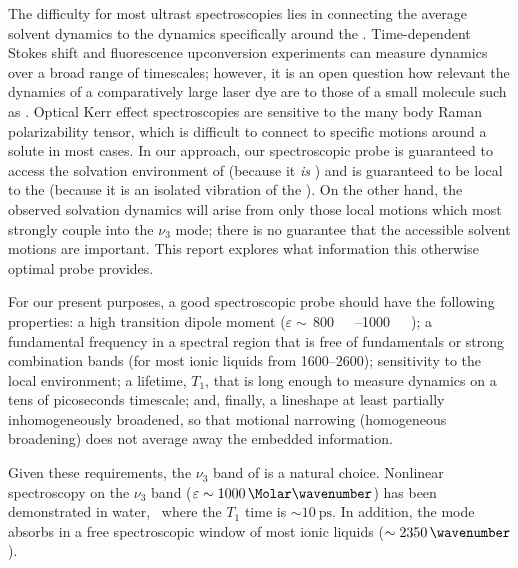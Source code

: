 The difficulty for most ultrast spectroscopies lies in connecting the average solvent dynamics to the dynamics specifically around the . Time-dependent Stokes shift and fluorescence upconversion experiments\cite{zhangJPCB-12} can measure dynamics over a broad range of timescales; however, it is an open question how relevant the dynamics of a comparatively large laser dye are to those of a small molecule such as . Optical Kerr effect spectroscopies\cite{turtonJACS-09,castnerACR-07} are sensitive to the many body Raman polarizability tensor, which is difficult to connect to specific motions around a solute in most cases. In our approach, our spectroscopic probe is guaranteed to access the solvation environment of  (because it \emph{is} ) and is guaranteed to be local to the  (because it is an isolated vibration of the ). On the other hand, the observed solvation dynamics will arise from only those local motions which most strongly couple into the \(\nu_3\) mode; there is no guarantee that the accessible solvent motions are important. This report explores what information this otherwise optimal probe provides.

For our present purposes, a good spectroscopic probe should have the following properties: a high transition dipole moment (\(\varepsilon \sim\,\)\SIrange{800}{1000}{\per\Molar\wavenumber}); a fundamental frequency in a spectral region that is free of fundamentals or strong combination bands (for most ionic liquids from \SIrange{1600}{2600}{\wavenumber}); sensitivity to the local environment; a lifetime, \(T_1\), that is long enough to measure dynamics on a tens of picoseconds timescale; and, finally, a lineshape at least partially inhomogeneously broadened, so that motional narrowing (homogeneous broadening) does not average away the embedded information.

Given these requirements, the \(\nu_3\) band of  is a natural choice. Nonlinear spectroscopy on the \(\nu_3\) band (\(\varepsilon \sim \SI{1000}{\per\Molar\wavenumber}\)) has been demonstrated in water,~\cite{Hamm1998,Garrett-Roe2009a} where the \(T_1\) time is \(\sim \SI{10}{\ps}\). In addition, the mode absorbs in a free spectroscopic window of most ionic liquids (\(\sim \SI{2350}{\wavenumber}\)).

